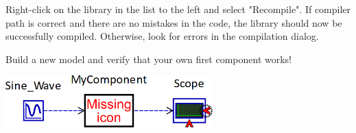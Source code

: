 \documentclass[a4paper,pdftex]{article}
\begin{document}
\begin{tutenumerate}
Right-click on the library in the list to the left and select "Recompile". If compiler path is correct and there are no mistakes in the code, the library should now be successfully compiled. Otherwise, look for errors in the compilation dialog.

Build a new model and verify that your own first component works!

 	\vspace{12pt}
\includegraphics[width=0.6\textwidth]{gfx/writingcomponents/testmodel.png}
 	
\end{tutenumerate}
 	
\end{document}
